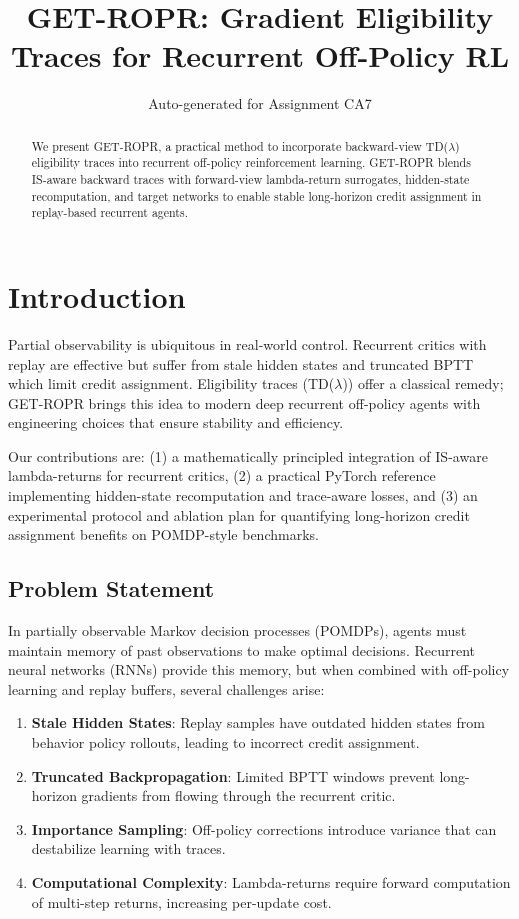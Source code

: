 \documentclass{article}
\title{GET-ROPR: Gradient Eligibility Traces for Recurrent Off-Policy RL}
\author{Auto-generated for Assignment CA7}
\begin{document}
\maketitle

\begin{abstract}
We present GET-ROPR, a practical method to incorporate backward-view
TD($\lambda$) eligibility traces into recurrent off-policy reinforcement learning.
GET-ROPR blends IS-aware backward traces with forward-view lambda-return surrogates,
hidden-state recomputation, and target networks to enable stable long-horizon credit assignment
in replay-based recurrent agents.
\end{abstract}

\section{Introduction}
Partial observability is ubiquitous in real-world control. Recurrent critics with replay
are effective but suffer from stale hidden states and truncated BPTT which limit credit
assignment. Eligibility traces (TD($\lambda$)) offer a classical remedy; GET-ROPR brings
this idea to modern deep recurrent off-policy agents with engineering choices that ensure
stability and efficiency.

Our contributions are: (1) a mathematically principled integration of IS-aware lambda-returns
for recurrent critics, (2) a practical PyTorch reference implementing hidden-state
recomputation and trace-aware losses, and (3) an experimental protocol and ablation plan
for quantifying long-horizon credit assignment benefits on POMDP-style benchmarks.

\subsection{Problem Statement}
In partially observable Markov decision processes (POMDPs), agents must maintain memory
of past observations to make optimal decisions. Recurrent neural networks (RNNs) provide
this memory, but when combined with off-policy learning and replay buffers, several
challenges arise:

\begin{enumerate}
  \item \textbf{Stale Hidden States}: Replay samples have outdated hidden states from
  behavior policy rollouts, leading to incorrect credit assignment.
  
  \item \textbf{Truncated Backpropagation}: Limited BPTT windows prevent long-horizon
  gradients from flowing through the recurrent critic.
  
  \item \textbf{Importance Sampling}: Off-policy corrections introduce variance that
  can destabilize learning with traces.
  
  \item \textbf{Computational Complexity}: Lambda-returns require forward computation
  of multi-step returns, increasing per-update cost.
\end{enumerate}
\end{document}

